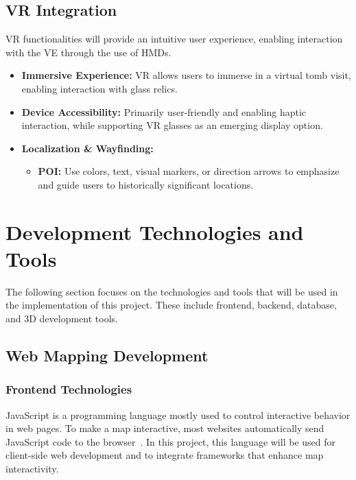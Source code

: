 \subsection*{\gls{VR} Integration}
\gls{VR} functionalities will provide an intuitive user experience, enabling interaction with the \gls{VE} through the use of \glspl{HMD}.
\begin{itemize}
    \item \textbf{Immersive Experience:} \gls{VR} allows users to immerse in a virtual tomb visit, enabling interaction with glass relics.
    \item \textbf{Device Accessibility:} Primarily user-friendly and enabling haptic interaction, while supporting \gls{VR} glasses as an emerging display option.
    \item \textbf{Localization \& Wayfinding:} 
    \begin{itemize}
        \item \textbf{\gls{POI}:} Use colors, text, visual markers, or direction arrows to emphasize and guide users to historically significant locations.
    \end{itemize}
\end{itemize}

\section{Development Technologies and Tools}
\label{sec:technologies}

The following section focuses on the technologies and tools that will be used in the implementation of this project. These include frontend, backend, database, and \gls{3D} development tools.

\subsection{Web Mapping Development}

\subsubsection{Frontend Technologies}
\label{sec:frontend}

JavaScript is a programming language mostly used to control interactive behavior in web
pages. To make a map interactive, most websites automatically send JavaScript code to the browser~\cite{ajayi2024utilizing}. In this project, this language will be used for client-side web development and to integrate frameworks that enhance map interactivity.

